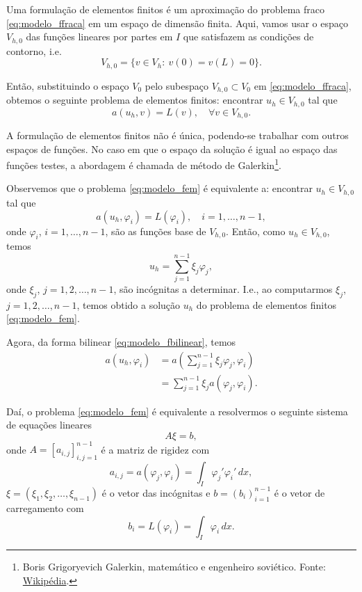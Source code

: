 Uma formulação de elementos finitos é um aproximação do problema fraco \eqref{eq:modelo_ffraca} em um espaço de dimensão finita. Aqui, vamos usar o espaço $V_{h,0}$ das funções lineares por partes em $I$ que satisfazem as condições de contorno, i.e.
\begin{equation}
  V_{h,0} = \{v\in V_h:~v(0)=v(L)=0\}.
\end{equation}

Então, substituindo o espaço $V_0$ pelo subespaço $V_{h,0}\subset V_0$ em \eqref{eq:modelo_ffraca}, obtemos o seguinte problema de elementos finitos: encontrar $u_h\in V_{h,0}$ tal que
\begin{equation}\label{eq:modelo_fem}
  a(u_h,v) = L(v),\quad\forall v\in V_{h,0}.
\end{equation}

\begin{obs}
  A formulação de elementos finitos não é única, podendo-se trabalhar com outros espaços de funções. No caso em que o espaço da solução é igual ao espaço das funções testes, a abordagem é chamada de método de Galerkin\footnote{Boris Grigoryevich Galerkin, matemático e engenheiro soviético. Fonte: \href{https://pt.wikipedia.org/wiki/Boris_Galerkin}{Wikipédia}.}.
\end{obs}

Observemos que o problema \eqref{eq:modelo_fem} é equivalente a: encontrar $u_h\in V_{h,0}$ tal que
\begin{equation}
  a(u_h,\varphi_i) = L(\varphi_i),\quad i=1, \dotsc, n-1,
\end{equation}
onde $\varphi_i$, $i=1,\dotsc,n-1$, são as funções base de $V_{h,0}$. Então, como $u_h\in V_{h,0}$, temos
\begin{equation}
  u_h = \sum_{j=1}^{n-1}\xi_j\varphi_j,
\end{equation}
onde $\xi_j$, $j=1,2,\dotsc,n-1$, são incógnitas a determinar. I.e., ao computarmos $\xi_j$, $j=1,2,\dotsc,n-1$, temos obtido a solução $u_h$ do problema de elementos finitos \ref{eq:modelo_fem}.

Agora, da forma bilinear \eqref{eq:modelo_fbilinear}, temos
\begin{align}
  a(u_h,\varphi_i) &= a\left(\sum_{j=1}^{n-1}\xi_j\varphi_j,\varphi_i\right)\\
  &= \sum_{j=1}^{n-1}\xi_j a(\varphi_j,\varphi_i).
\end{align}

Daí, o problema \eqref{eq:modelo_fem} é equivalente a resolvermos o seguinte sistema de equações lineares
\begin{equation}\label{eq:modelo_fem_sis}
  A\xi = b,
\end{equation}
onde $A = [a_{i,j}]_{i,j=1}^{n-1}$ é a matriz de rigidez com
\begin{equation}
  a_{i,j} = a(\varphi_j,\varphi_i) = \int_{I}\varphi_j'\varphi_i'\,dx,
\end{equation}
$\xi = (\xi_1,\xi_2,\dotsc,\xi_{n-1})$ é o vetor das incógnitas e $b = (b_{i})_{i=1}^{n-1}$ é o vetor de carregamento com
\begin{equation}
  b_i = L(\varphi_i) = \int_I\varphi_i\,dx.
\end{equation}

